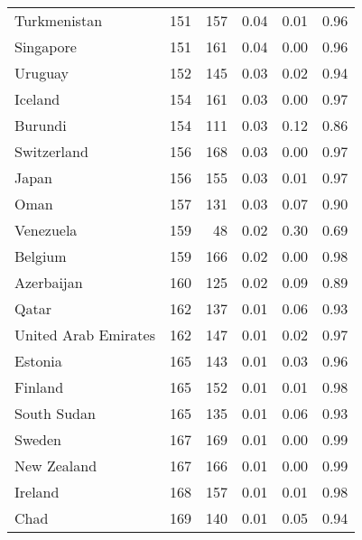 \begin{longtable}[t]{lrrrrr}
Turkmenistan & 151 & 157 & 0.04 & 0.01 & 0.96\\
\addlinespace
Singapore & 151 & 161 & 0.04 & 0.00 & 0.96\\
Uruguay & 152 & 145 & 0.03 & 0.02 & 0.94\\
Iceland & 154 & 161 & 0.03 & 0.00 & 0.97\\
Burundi & 154 & 111 & 0.03 & 0.12 & 0.86\\
Switzerland & 156 & 168 & 0.03 & 0.00 & 0.97\\
\addlinespace
Japan & 156 & 155 & 0.03 & 0.01 & 0.97\\
Oman & 157 & 131 & 0.03 & 0.07 & 0.90\\
Venezuela & 159 & 48 & 0.02 & 0.30 & 0.69\\
Belgium & 159 & 166 & 0.02 & 0.00 & 0.98\\
Azerbaijan & 160 & 125 & 0.02 & 0.09 & 0.89\\
\addlinespace
Qatar & 162 & 137 & 0.01 & 0.06 & 0.93\\
United Arab Emirates & 162 & 147 & 0.01 & 0.02 & 0.97\\
Estonia & 165 & 143 & 0.01 & 0.03 & 0.96\\
Finland & 165 & 152 & 0.01 & 0.01 & 0.98\\
South Sudan & 165 & 135 & 0.01 & 0.06 & 0.93\\
\addlinespace
Sweden & 167 & 169 & 0.01 & 0.00 & 0.99\\
New Zealand & 167 & 166 & 0.01 & 0.00 & 0.99\\
Ireland & 168 & 157 & 0.01 & 0.01 & 0.98\\
Chad & 169 & 140 & 0.01 & 0.05 & 0.94\\
\bottomrule
\end{longtable}
